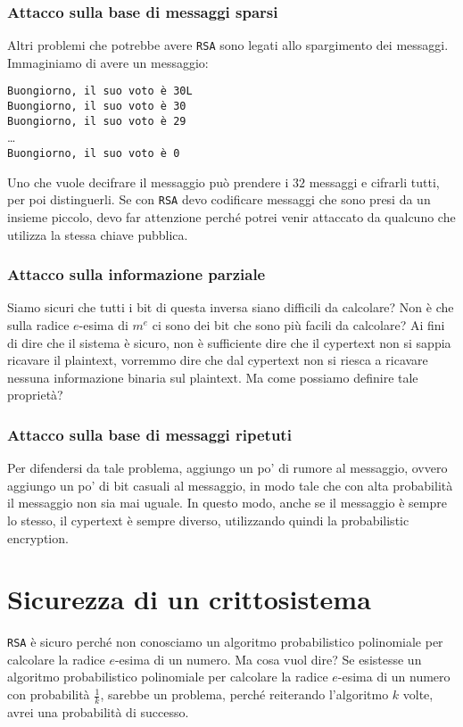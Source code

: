 \subsubsection{Attacco sulla base di messaggi sparsi}
Altri problemi che potrebbe avere \texttt{RSA} sono legati allo spargimento dei 
messaggi.
Immaginiamo di avere un messaggio:

\begin{center}
  \texttt{Buongiorno, il suo voto è 30L}\\
  \texttt{Buongiorno, il suo voto è 30}\\
  \texttt{Buongiorno, il suo voto è 29}\\
  \dots\\
  \texttt{Buongiorno, il suo voto è 0}\\
\end{center}
Uno che vuole decifrare il messaggio può prendere i $32$ messaggi e
cifrarli tutti, per poi distinguerli.
Se con \texttt{RSA} devo codificare messaggi che sono presi da un insieme piccolo,
devo far attenzione perché potrei venir attaccato da qualcuno che utilizza 
la stessa chiave pubblica.
\subsubsection{Attacco sulla informazione parziale}
Siamo sicuri che tutti i bit di questa inversa siano difficili da calcolare?
Non è che sulla radice $e$-esima di $m^e$ ci sono dei bit che sono più facili 
da calcolare? Ai fini di dire che il sistema è sicuro, non è 
sufficiente dire che il cypertext non si sappia ricavare il plaintext,
vorremmo dire che dal cypertext non si riesca a ricavare nessuna informazione 
binaria sul plaintext. Ma come possiamo definire tale proprietà?
\subsubsection{Attacco sulla base di messaggi ripetuti}
Per difendersi da tale problema, aggiungo un po' di rumore al messaggio,
ovvero aggiungo un po' di bit casuali al messaggio, in modo tale che con 
alta probabilità il messaggio non sia mai uguale. In questo modo, anche se
il messaggio è sempre lo stesso, il cypertext è sempre diverso, utilizzando 
quindi la probabilistic encryption.
\section{Sicurezza di un crittosistema}
\texttt{RSA} è sicuro perché non conosciamo un algoritmo probabilistico polinomiale 
per calcolare la radice $e$-esima di un numero. Ma cosa vuol dire?
Se esistesse un algoritmo probabilistico polinomiale per calcolare la radice 
$e$-esima di un numero con probabilità $\frac{1}{k}$, sarebbe un problema,
perché reiterando l'algoritmo $k$ volte, avrei una probabilità di successo.

